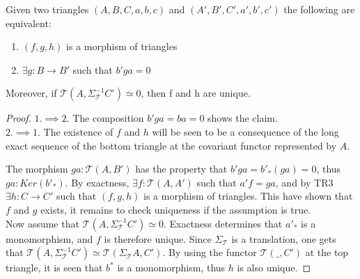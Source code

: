     \begin{lemma}
        Given two triangles $(A,B,C,a,b,c)$ and $(A',B',C',a',b',c')$ the following are equivalent:
        \begin{center}
            \begin{minipage}[c]{0.4\textwidth}
            \end{minipage}
            \begin{minipage}[c]{0.5\textwidth}
                \begin{enumerate}
                    \item $(f,g,h)$ is a morphism of triangles
                    \item $\exists g:B\rightarrow B'$ such that $b'ga = 0$
                \end{enumerate}
            \end{minipage}
        \end{center}
        Moreover, if $\mathcal{T}(A,\Sigma_{\mathcal{T}}^{-1}C')\simeq 0$, then f and h are unique.
    \end{lemma}

    \begin{proof}
        $1. \implies 2.$ The composition $b'ga = ba = 0$ shows the claim. \\
        
        $2. \implies 1.$ The existence of $f$ and $h$ will be seen to be a consequence of the long exact sequence of the bottom triangle at the covariant functor represented by $A$. 
        \begin{center}
        \end{center}
        The morphism $ga:\mathcal{T}(A,B')$ has the property that $b'ga=b'_*(ga)=0$, thus $ga:Ker(b'_*)$. By exactness, $\exists f:\mathcal{T}(A,A')$ such that $a'f = ga$, and by TR3 $\exists h: C \rightarrow C'$ such that $(f,g,h)$ is a morphism of triangles. This have shown that $f$ and $g$ exists, it remains to check uniqueness if the assumption is true. \\
        Now assume that $\mathcal{T}(A,\Sigma_{\mathcal{T}}^{-1}C')\simeq 0$. Exactness determines that $a'_*$ is a monomorphism, and $f$ is therefore unique. Since $\Sigma_{\mathcal{T}}$ is a translation, one gets that $\mathcal{T}(A,\Sigma_{\mathcal{T}}^{-1}C')\simeq\mathcal{T}(\Sigma_{\mathcal{T}}A,C')$. By using the functor $\mathcal{T}(\_,C')$ at the top triangle, it is seen that $b^*$ is a monomorphism, thus $h$ is also unique.
    \end{proof}

